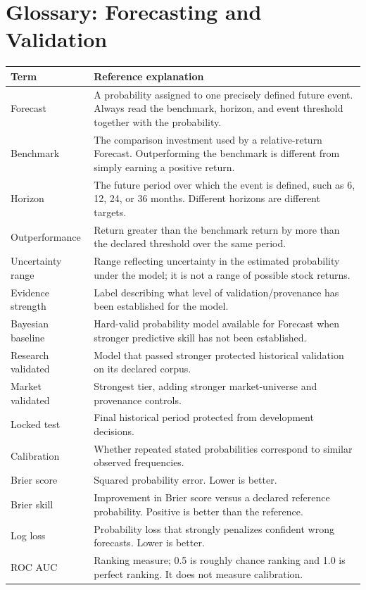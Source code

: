 \documentclass[11pt]{article}
\begin{document}
\section{Glossary: Forecasting and Validation}
\begin{longtable}{p{}p{}}
\toprule
Term & Reference explanation\\
\midrule
Forecast & A probability assigned to one precisely defined future event. Always read the benchmark, horizon, and event threshold together with the probability.\\
Benchmark & The comparison investment used by a relative-return Forecast. Outperforming the benchmark is different from simply earning a positive return.\\
Horizon & The future period over which the event is defined, such as 6, 12, 24, or 36 months. Different horizons are different targets.\\
Outperformance & Return greater than the benchmark return by more than the declared threshold over the same period.\\
Uncertainty range & Range reflecting uncertainty in the estimated probability under the model; it is not a range of possible stock returns.\\
Evidence strength & Label describing what level of validation/provenance has been established for the model.\\
Bayesian baseline & Hard-valid probability model available for Forecast when stronger predictive skill has not been established.\\
Research validated & Model that passed stronger protected historical validation on its declared corpus.\\
Market validated & Strongest tier, adding stronger market-universe and provenance controls.\\
Locked test & Final historical period protected from development decisions.\\
Calibration & Whether repeated stated probabilities correspond to similar observed frequencies.\\
Brier score & Squared probability error. Lower is better.\\
Brier skill & Improvement in Brier score versus a declared reference probability. Positive is better than the reference.\\
Log loss & Probability loss that strongly penalizes confident wrong forecasts. Lower is better.\\
ROC AUC & Ranking measure; 0.5 is roughly chance ranking and 1.0 is perfect ranking. It does not measure calibration.\\

\end{longtable}
\end{document}
